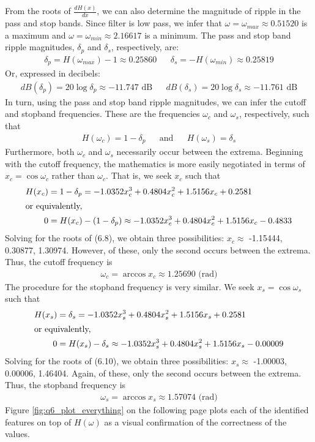 From the roots of $\frac{dH(x)}{dx}$, we can also determine the magnitude of ripple in the pass and stop bands. Since filter is low pass, we infer that $\omega=\omega_{max}\approx0.51520$ is a maximum and $\omega=\omega_{min}\approx2.16617$ is a minimum. The pass and stop band ripple magnitudes, $\delta_p$ and $\delta_s$, respectively, are:
\begin{align*}
    \delta_p = H(\omega_{max}) - 1 \approx 0.25860 &&
    \delta_s = -H(\omega_{min}) \approx 0.25819
\end{align*}
Or, expressed in decibels:
\begin{align*}
    dB(\delta_p) = 20\log\delta_p \approx -11.747 \text{ dB} &&
    dB(\delta_s) = 20\log\delta_s \approx -11.761 \text{ dB}
\end{align*}
In turn, using the pass and stop band ripple magnitudes, we can infer the cutoff and stopband frequencies. These are the frequencies $\omega_c$ and $\omega_s$, respectively, such that
\begin{align*}
    H(\omega_c) = 1 - \delta_p && \text{and} &&
    H(\omega_s) = \delta_s
\end{align*}
Furthermore, both $\omega_c$ and $\omega_s$ necessarily occur between the extrema. Beginning with the cutoff frequency, the mathematics is more easily negotiated in terms of $x_c=\cos\omega_c$ rather than $\omega_c$. That is, we seek $x_c$ such that
\begin{align}
    H(x_c) &= 1 - \delta_p = -1.0352x_c^3 + 0.4804x_c^2+ 1.5156x_c + 0.2581 \\
\intertext{or equivalently,}
         0 &= H(x_c) - (1 - \delta_p) \approx -1.0352x_c^3 + 0.4804x_c^2+ 1.5156x_c - 0.4833
\end{align}
Solving for the roots of (6.8), we obtain three possibilities: $x_c\approx$ -1.15444, 0.30877, 1.30974. However, of these, only the second occurs between the extrema. Thus, the cutoff frequency is
\begin{align*}
    \omega_c = \arccos x_c \approx 1.25690 \text{ (rad)}
\end{align*}
The procedure for the stopband frequency is very similar. We seek $x_s=\cos\omega_s$ such that
\begin{align}
    H(x_s) &= \delta_s = -1.0352x_s^3 + 0.4804x_s^2+ 1.5156x_s + 0.2581 \\
\intertext{or equivalently,}
         0 &= H(x_s) - \delta_s \approx -1.0352x_s^3 + 0.4804x_s^2+ 1.5156x_s - 0.00009
\end{align}
Solving for the roots of (6.10), we obtain three possibilities: $x_s\approx$ -1.00003, 0.00006, 1.46404. Again, of these, only the second occurs between the extrema. Thus, the stopband frequency is
\begin{align*}
    \omega_s = \arccos x_s \approx 1.57074 \text{ (rad)}
\end{align*}
Figure \ref{fig:q6_plot_everything} on the following page plots each of the identified features on top of $H(\omega)$ as a visual confirmation of the correctness of the values.

